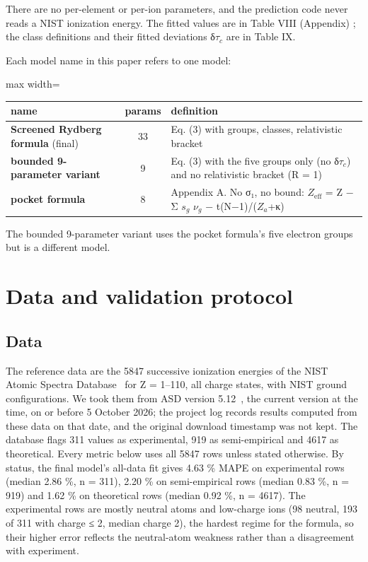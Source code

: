 \documentclass[aps,pra,preprint,notitlepage,superscriptaddress,amsmath,amssymb]{revtex4-2}
\begin{document}
There are no per-element or per-ion parameters, and the prediction code never reads a NIST ionization energy. The fitted values are in Table VIII (Appendix) ; the class definitions and their fitted deviations δ$τ_{c}$ are in Table IX.


Each model name in this paper refers to one model:


\begin{table}[h]
\footnotesize\linespread{1}\selectfont\setlength{\tabcolsep}{5pt}\renewcommand{\arraystretch}{1.1}
\begin{adjustbox}{max width=\linewidth}
\begin{tabular}{lcl}
\hline\hline
name & params & definition \\
\hline
\textbf{Screened Rydberg formula} (final) & 33 & Eq. (3) with groups, classes, relativistic bracket \\
\textbf{bounded 9-parameter variant} & 9 & Eq. (3) with the five groups only (no δ$τ_{c}$) and no relativistic bracket (R = 1) \\
\textbf{pocket formula} & 8 & Appendix A. No σ₁, no bound: $Z_{\mathrm{eff}}$ = Z − Σ $s_{g}$ $ν_{g}$ − t(N−1)/($Z_{a}$+κ) \\
\hline\hline
\end{tabular}
\end{adjustbox}
\end{table}


The bounded 9-parameter variant uses the pocket formula's five electron groups but is a different model.


\section{Data and validation protocol}

\subsection{Data}

The reference data are the 5847 successive ionization energies of the NIST Atomic Spectra Database~\cite{r31} for Z = 1–110, all charge states, with NIST ground configurations. We took them from ASD version 5.12~\cite{r31}, the current version at the time, on or before 5 October 2026; the project log records results computed from these data on that date, and the original download timestamp was not kept. The database flags 311 values as experimental, 919 as semi-empirical and 4617 as theoretical. Every metric below uses all 5847 rows unless stated otherwise. By status, the final model's all-data fit gives 4.63 \% MAPE on experimental rows (median 2.86 \%, n = 311), 2.20 \% on semi-empirical rows (median 0.83 \%, n = 919) and 1.62 \% on theoretical rows (median 0.92 \%, n = 4617). The experimental rows are mostly neutral atoms and low-charge ions (98 neutral, 193 of 311 with charge ≤ 2, median charge 2), the hardest regime for the formula, so their higher error reflects the neutral-atom weakness rather than a disagreement with experiment.
\end{document}
